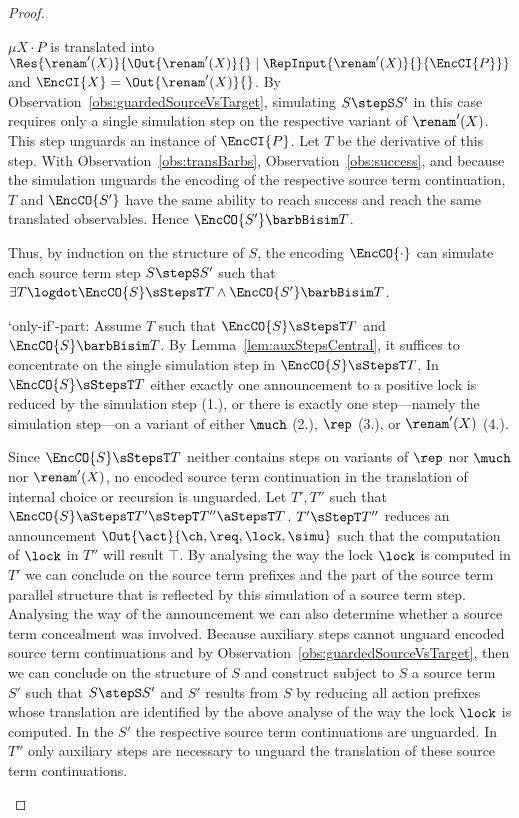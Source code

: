 \documentclass[]{eptcs}
\begin{document}
\begin{proof}
\begin{compactitem}
\begin{compactenum}
				\item $ \mu X \cdot P $ is translated into $ \Res{\renam'(X)}{\Out{\renam'(X)}{} \mid \RepInput{\renam'(X)}{}{\EncCI{P}}} $ and $ \EncCI{X} = \Out{\renam'(X)}{} $. By Observation~\ref{obs:guardedSourceVsTarget}, simulating $ S \stepS S' $ in this case requires only a single simulation step on the respective variant of $ \renam'(X) $. This step unguards an instance of $ \EncCI{P} $. Let $ T $ be the derivative of this step. With Observation~\ref{obs:transBarbs}, Observation~\ref{obs:success}, and because the simulation unguards the encoding of the respective source term continuation, $ T $ and $ \EncCO{S'} $ have the same ability to reach success and reach the same translated observables. Hence $ \EncCO{S'} \barbBisim T $.
			\end{compactenum}
			Thus, by induction on the structure of $ S $, the encoding $ \EncCO{\cdot} $ can simulate each source term step $ S \stepS S' $ such that $ \exists T\logdot \EncCO{S} \sStepsT T \wedge \EncCO{S'} \barbBisim T $.
		\item[`only-if'-part:] Assume $ T $ such that $ \EncCO{S} \sStepsT T $ and $ \EncCO{S} \barbBisim T $. By Lemma~\ref{lem:auxStepsCentral}, it suffices to concentrate on the single simulation step in $ \EncCO{S} \sStepsT T $. In $ \EncCO{S} \sStepsT T $ either exactly one announcement \wrt to a positive lock is reduced by the simulation step (1.), or there is exactly one step---namely the simulation step---on a variant of either $ \much $ (2.), $ \rep $ (3.), or $ \renam'(X) $ (4.).
			\begin{compactenum}
				\item Since $ \EncCO{S} \sStepsT T $ neither contains steps on variants of $ \rep $ nor $ \much $ nor $ \renam'(X) $, no encoded source term continuation in the translation of internal choice or recursion is unguarded. Let $ T', T'' $ such that $ \EncCO{S} \aStepsT T' \sStepT T'' \aStepsT T $. $ T' \sStepT T'' $ reduces an announcement $ \Out{\act}{\ch, \req, \lock, \simu} $ such that the computation of $ \lock $ in $ T'' $ will result $ \top $.	By analysing the way the lock $ \lock $ is computed in $ T' $ we can conclude on the source term prefixes and the part of the source term parallel structure that is reflected by this simulation of a source term step. Analysing the way of the announcement we can also determine whether a source term concealment was involved.
					Because auxiliary steps cannot unguard encoded source term continuations and by Observation~\ref{obs:guardedSourceVsTarget}, then we can conclude on the structure of $ S $ and construct subject to $ S $ a source term $ S' $ such that $ S \stepS S' $ and $ S' $ results from $ S $ by reducing all action prefixes whose translation are identified by the above analyse of the way the lock $ \lock $ is computed. In the $ S' $ the respective source term continuations are unguarded. In $ T'' $ only auxiliary steps are necessary to unguard the translation of these source term continuations.

\end{compactenum}
\end{compactitem}
\end{proof}
\end{document}
